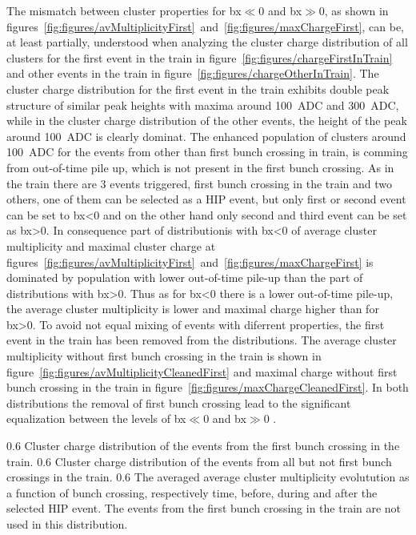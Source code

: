 The mismatch between cluster properties for bx$\ll$0 and bx$\gg$0, as shown in figures~\ref{fig:figures/avMultiplicityFirst}~and~\ref{fig:figures/maxChargeFirst}, can be, at least partially, understood when analyzing the cluster charge distribution of all clusters for the first event in the train in figure~\ref{fig:figures/chargeFirstInTrain} and other events in the train in figure~\ref{fig:figures/chargeOtherInTrain}. The cluster charge distribution for the first event in the train exhibits double peak structure of similar peak heights with maxima around 100~ADC and 300~ADC, while in the cluster charge distribution of the other events, the height of the peak around 100~ADC is clearly dominat. The enhanced population of clusters around 100~ADC for the events from other than first bunch crossing in train, is comming from out-of-time pile up, which is not present in the first bunch crossing. As in the train there are 3 events triggered, first bunch crossing in the train and two others, one of them can be selected as a HIP event, but only first or second event can be set to bx<0 and on the other hand only second and third event can be set as bx>0. In consequence part of distributionis with bx<0 of average cluster multiplicity and maximal cluster charge at figures~\ref{fig:figures/avMultiplicityFirst}~and~\ref{fig:figures/maxChargeFirst} is dominated by population with lower out-of-time pile-up than the part of distributions with bx>0. Thus as for bx<0 there is a lower out-of-time pile-up, the average cluster multiplicity is lower and maximal charge higher than for bx>0. To avoid not equal mixing of events with diferrent properties, the first event in the train has been removed from the distributions. The average cluster multiplicity without first bunch crossing in the train is shown in figure~\ref{fig:figures/avMultiplicityCleanedFirst} and maximal charge without first bunch crossing in the train in figure~\ref{fig:figures/maxChargeCleanedFirst}. In both distributions the removal of first bunch crossing lead to the significant equalization between the levels of bx$\ll$0 and bx$\gg$0 .

                 {0.6}       %
                 {Cluster charge distribution of the events from the first bunch crossing in the train. } %
                 {0.6}       %
                 {Cluster charge distribution of the events from all but not first bunch crossings in the train. } %
                 {0.6}       %
                 {The averaged average cluster multiplicity evolutution as a function of bunch crossing, respectively time, before, during and after the selected HIP event. The events from the first bunch crossing in the train are not used in this distribution. } %

